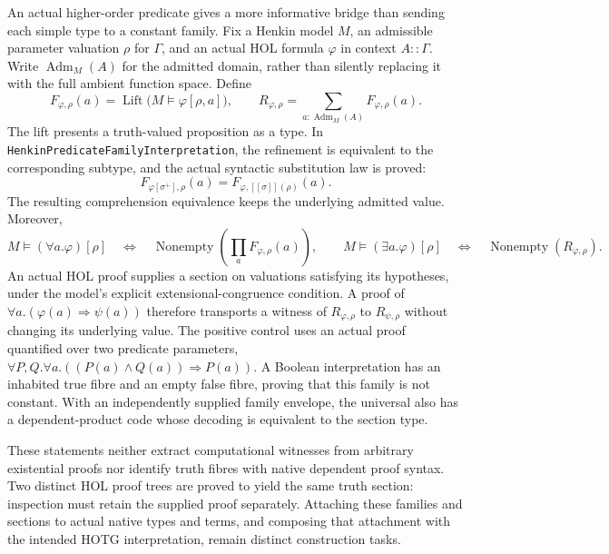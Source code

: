 \documentclass[11pt]{article}
\theoremstyle{definition}
\theoremstyle{remark}
\newcommand{\sem}[1]{[\![#1]\!]}
\begin{document}
An actual higher-order predicate gives a more informative bridge than sending
each simple type to a constant family. Fix a Henkin model $M$, an admissible
parameter valuation $\rho$ for $\Gamma$, and an actual HOL formula
$\varphi$ in context $A::\Gamma$. Write $\operatorname{Adm}_M(A)$ for
the admitted domain, rather than silently replacing it with the full ambient
function space. Define
\[
  F_{\varphi,\rho}(a)
    = \operatorname{Lift}\bigl(M\models\varphi[\rho,a]\bigr),
  \qquad
  R_{\varphi,\rho}=\sum_{a:\operatorname{Adm}_M(A)}F_{\varphi,\rho}(a).
\]
The lift presents a truth-valued proposition as a type. In
\nolinkurl{HenkinPredicateFamilyInterpretation}, the refinement is equivalent
to the corresponding subtype, and the actual syntactic substitution law is
proved:
\[
  F_{\varphi[\sigma^+],\rho}(a)
     =F_{\varphi,\sem\sigma(\rho)}(a).
\]
The resulting comprehension equivalence keeps the underlying admitted value.
Moreover,
\[
  M\models(\forall a.\varphi)[\rho]
    \quad\Longleftrightarrow\quad
      \operatorname{Nonempty}\!\left(\prod_a F_{\varphi,\rho}(a)\right),
  \qquad
  M\models(\exists a.\varphi)[\rho]
    \quad\Longleftrightarrow\quad
      \operatorname{Nonempty}(R_{\varphi,\rho}).
\]
An actual HOL proof supplies a section on valuations satisfying its hypotheses,
under the model's explicit extensional-congruence condition. A proof of
$\forall a.(\varphi(a)\Rightarrow\psi(a))$ therefore transports a witness of
$R_{\varphi,\rho}$ to $R_{\psi,\rho}$ without changing its underlying value.
The positive control uses an actual proof quantified over two predicate
parameters, $\forall P,Q.\forall a.((P(a)\land Q(a))\Rightarrow P(a))$.
A Boolean interpretation has an inhabited true fibre and an empty false
fibre, proving that this family is not constant. With an independently supplied
family envelope, the universal also has a dependent-product code whose
decoding is equivalent to the section type.

These statements neither extract computational witnesses from arbitrary
existential proofs nor identify truth fibres with native dependent proof syntax.
Two distinct HOL proof trees are proved to yield the same truth section:
inspection must retain the supplied proof separately. Attaching these families
and sections to actual native types and terms, and composing that attachment
with the intended HOTG interpretation, remain distinct construction tasks.
\end{document}
